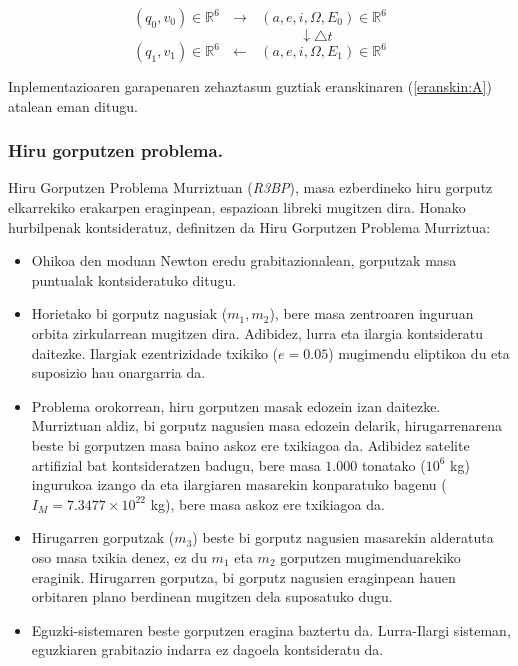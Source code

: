 \begin{equation*}
(q_0,v_0) \in \mathbb{R}^6 \ \ \ \longrightarrow \ \ \  (a,e,i,\Omega,E_0) \in \mathbb{R}^6 
\end{equation*}
\begin{equation*}
\quad \quad \quad \quad \quad \quad \quad \quad \downarrow \triangle t
\end{equation*}
\begin{equation*}
(q_1,v_1) \in \mathbb{R}^6 \ \ \ \longleftarrow \ \ \  (a,e,i,\Omega,E_1) \in \mathbb{R}^6 
\end{equation*}

Inplementazioaren garapenaren zehaztasun guztiak eranskinaren (\ref{eranskin:A}) atalean eman ditugu.

\subsubsection*{Hiru gorputzen problema.}

Hiru Gorputzen Problema Murriztuan (\emph{R3BP}),  
masa ezberdineko hiru gorputz elkarrekiko erakarpen eraginpean, espazioan libreki mugitzen dira. Honako hurbilpenak kontsideratuz, definitzen da Hiru Gorputzen Problema Murriztua:

\begin{itemize}
\item Ohikoa den moduan Newton eredu grabitazionalean, gorputzak masa puntualak kontsideratuko ditugu. 
\item  Horietako bi gorputz nagusiak ($m_1,m_2$), bere masa zentroaren inguruan orbita zirkularrean mugitzen dira. Adibidez, lurra eta ilargia kontsideratu daitezke. Ilargiak ezentrizidade txikiko ($e=0.05$) mugimendu eliptikoa du eta suposizio hau onargarria da.
\item Problema orokorrean, hiru gorputzen masak edozein izan daitezke. Murriztuan aldiz, bi gorputz nagusien masa edozein delarik, hirugarrenarena beste bi gorputzen masa baino askoz ere txikiagoa da. Adibidez satelite artifizial bat kontsideratzen badugu, bere masa $1.000$ tonatako ($10^6$ kg) ingurukoa izango da  eta ilargiaren masarekin konparatuko bagenu ($I_M=7.3477 \times 10^{22}$ kg), bere masa askoz ere txikiagoa da.
\item Hirugarren gorputzak ($m_3$) beste bi gorputz nagusien masarekin alderatuta oso masa txikia denez, ez du $m_1$ eta $m_2$ gorputzen mugimenduarekiko eraginik. Hirugarren gorputza, bi gorputz nagusien eraginpean hauen orbitaren plano berdinean mugitzen dela suposatuko dugu.
\item Eguzki-sistemaren beste gorputzen eragina baztertu da. Lurra-Ilargi sisteman, eguzkiaren grabitazio indarra ez dagoela kontsideratu da. 
\end{itemize} 


